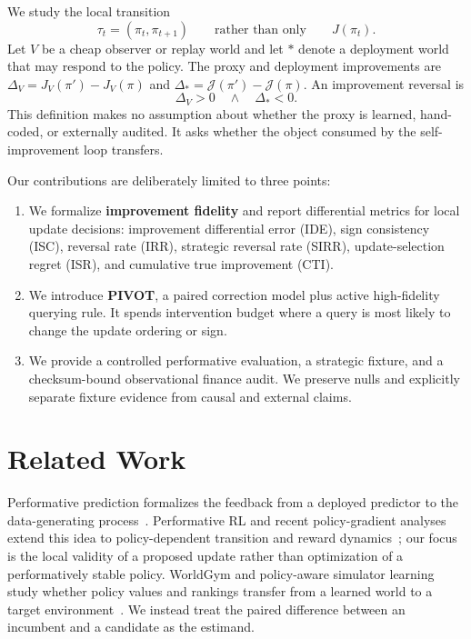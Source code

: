 \documentclass[10pt,twocolumn]{article}
\newcommand{\J}{\mathcal{J}}
\newcommand{\pii}{\pi}
\newcommand{\pip}{\pi'}
\newcommand{\dproxy}{\Delta_V}
\newcommand{\dtrue}{\Delta_*}
\begin{document}
We study the local transition
\begin{equation}
    \tau_t=(\pi_t,\pi_{t+1})
    \qquad\text{rather than only}\qquad J(\pi_t).
\end{equation}
Let $V$ be a cheap observer or replay world and let $*$ denote a deployment
world that may respond to the policy. The proxy and deployment improvements
are $\dproxy=J_V(\pip)-J_V(\pii)$ and
$\dtrue=\J(\pip)-\J(\pii)$. An improvement reversal is
\begin{equation}
    \dproxy>0\quad\land\quad\dtrue<0.
\end{equation}
This definition makes no assumption about whether the proxy is learned,
hand-coded, or externally audited. It asks whether the object consumed by the
self-improvement loop transfers.

Our contributions are deliberately limited to three points:
\begin{enumerate}
  \item We formalize \textbf{improvement fidelity} and report differential
  metrics for local update decisions: improvement differential error (IDE),
  sign consistency (ISC), reversal rate (IRR), strategic reversal rate (SIRR),
  update-selection regret (ISR), and cumulative true improvement (CTI).
  \item We introduce \textbf{PIVOT}, a paired correction model plus active
  high-fidelity querying rule. It spends intervention budget where a query is
  most likely to change the update ordering or sign.
  \item We provide a controlled performative evaluation, a strategic fixture,
  and a checksum-bound observational finance audit. We preserve nulls and
  explicitly separate fixture evidence from causal and external claims.
\end{enumerate}

\section{Related Work}
Performative prediction formalizes the feedback from a deployed predictor to
the data-generating process~\cite{perdomo2020performative}. Performative RL
and recent policy-gradient analyses extend this idea to policy-dependent
transition and reward dynamics~\cite{performativepg2025}; our focus is the
local validity of a proposed update rather than optimization of a
performatively stable policy. WorldGym and policy-aware simulator learning
study whether policy values and rankings transfer from a learned world to a
target environment~\cite{worldgym2025,policyaware2026}. We instead treat the
paired difference between an incumbent and a candidate as the estimand.
\end{document}
